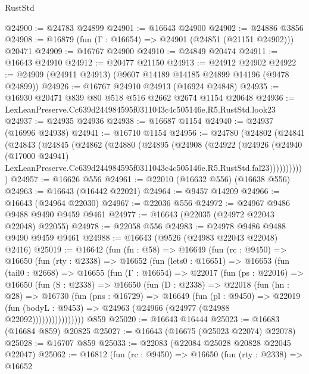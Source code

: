\begin{lexlean}{RustStd}
\begin{coremodule}
@24900 := @24783 @24899
@24901 := @16643 @24900
@24902 := @24886 @3856
@24908 := @16879 (fun (Γ : @16654) => @24901 (@24851 (@21151 @24902))) @20471
@24909 := @16767 @24900
@24910 := @24849 @20474
@24911 := @16643 @24910
@24912 := @20477 @21150
@24913 := @24912 @24902
@24922 := @24909 (@24911 @24913) (@9607 @14189 @14185 @24899 @14196 (@9478 @24899))
@24926 := @16767 @24910 @24913 (@16924 @24848)
@24935 := @16930 @20471 @839 @80 @518 @516 @2662 @2674 @1154 @20648
@24936 := LexLeanPreserve.Cc639d244984595f0311043c4c505146e.R5.RustStd.look23
@24937 := @24935 @24936
@24938 := @16687 @1154
@24940 := @24937 (@16996 @24938)
@24941 := @16710 @1154
@24956 := @24780
    (@24802
      (@24841
        (@24843
          (@24845
            (@24862
              (@24880
                (@24895
                  (@24908
                    (@24922
                      (@24926
                        (@24940
                          (@17000 @24941)
                          LexLeanPreserve.Cc639d244984595f0311043c4c505146e.R5.RustStd.fal23)))))))))))
@24957 := @16626 @556
@24961 := @22010 (@16632 @556) (@16638 @556)
@24963 := @16643 (@16442 @22021)
@24964 := @9457 @14209
@24966 := @16643 (@24964 @22030)
@24967 := @22036 @556
@24972 := @24967 @9486 @9488 @9490 @9459 @9461
@24977 := @16643 (@22035 (@24972 @22043 @22048) @22055)
@24978 := @22058 @556
@24983 := @24978 @9486 @9488 @9490 @9459 @9461
@24988 := @16643 (@9526 (@24983 @22043 @22048) @2416)
@25019 := @16642
    (fun (fn : @58) =>
    @16649
      (fun (rc : @9450) =>
      @16650
        (fun (rty : @2338) =>
        @16652
          (fun (lets0 : @16651) =>
          @16653
            (fun (tail0 : @2668) =>
            @16655
              (fun (Γ : @16654) =>
              @22017
                (fun (ps : @22016) =>
                @16650
                  (fun (S : @2338) =>
                  @16650
                    (fun (D : @2338) =>
                    @22018
                      (fun (hn : @28) =>
                      @16730
                        (fun (pns : @16729) =>
                        @16649
                          (fun (pl : @9450) =>
                          @22019
                            (fun (bodyL : @9453) =>
                            @24963 (@24966 (@24977 (@24988 @22092))))))))))))))))
    @859
@25020 := @16643 @16444
@25023 := @16683 (@16684 @859) @20825
@25027 := @16643 (@16675 (@25023 @22074) @22078)
@25028 := @16707 @859
@25033 := @22083 (@22084 @25028 @20828 @22045 @22047)
@25062 := @16812
    (fun (rc : @9450) =>
    @16650
      (fun (rty : @2338) =>
      @16652

\end{coremodule}
\end{lexlean}
